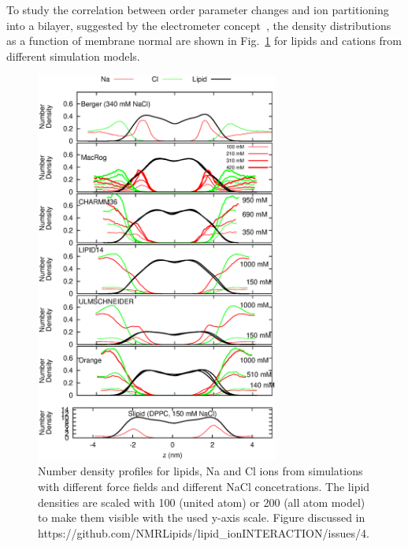 \documentclass[pre,aps,floatfix,authordate1-4,twocolumn]{revtex4-1}
\begin{document}
To study the correlation between order parameter changes and ion partitioning into a bilayer, 
suggested by the electrometer concept~\cite{akutsu81,altenbach84,seelig87,scherer89}, the density distributions as a function of membrane normal 
are shown in Fig.~\ref{IONdensCOMP} for lipids and cations from different simulation models. 
\begin{figure}[]
  \centering
  \includegraphics[width=8cm]{../Fig/NAdensities.eps}
  \caption{\label{IONdensCOMP}
    Number density profiles for lipids, Na and Cl ions from simulations with different force fields and different NaCl concetrations. 
    The lipid densities are scaled with 100 (united atom) or 200 (all atom model) to make them visible with the used y-axis scale.
    Figure discussed in https://github.com/NMRLipids/lipid\_ionINTERACTION/issues/4.
  }
\end{figure}
\end{document}
